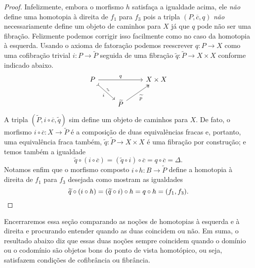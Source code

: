 \begin{proof}
  Infelizmente, embora o morfismo $h$ satisfaça a igualdade acima, ele \emph{não} define uma homotopia à direita de $f_{1}$ para $f_{3}$ pois a tripla $(P,\overline{c},q)$ \emph{não} necessariamente define um objeto de caminhos para $X$ já que $q$ pode não ser uma fibração.
  Felizmente podemos corrigir isso facilmente como no caso da homotopia à esquerda.
  Usando o axioma de fatoração podemos reescrever $q: P \to X$ como uma cofibração trivial $i: P \to \widetilde{P}$ seguida de uma fibração $\widetilde{q}: \widetilde{P} \to X \times X$ conforme indicado abaixo.
  \begin{displaymath}
    \begin{tikzcd}
      P
      \arrow[rr, "q"]
      \arrow[rd, tail, "i" {swap}, "\sim" {sloped}]
      & & X \times X
      \\ & \widetilde{P}
      \arrow[ru, two heads, "\widetilde{p}" swap]
    \end{tikzcd}
  \end{displaymath}
  A tripla $(\widetilde{P},i \circ \overline{c},\widetilde{q})$ sim define um objeto de caminhos para $X$.
  De fato, o morfismo $i \circ \overline{c}: X \to \widetilde{P}$ é a composição de duas equivalências fracas e, portanto, uma equivalência fraca também, $\widetilde{q}: \widetilde{P} \to X \times X$ é uma fibração por construção; e temos também a igualdade
  \begin{displaymath}
    \widetilde{q} \circ (i \circ \overline{c}) = (\widetilde{q} \circ i) \circ \overline{c} = q \circ \overline{c} = \Delta.
  \end{displaymath}
  Notamos enfim que o morfismo composto $i \circ h: B \to \widetilde{P}$ define a homotopia à direita de $f_{1}$ para $f_{3}$ desejada como mostram as igualdades
  \begin{displaymath}
    \widetilde{q} \circ (i \circ h) = (\widetilde{q} \circ i) \circ h = q \circ h = (f_{1},f_{3}). \qedhere
  \end{displaymath}
\end{proof}

Encerraremos essa seção comparando as noções de homotopias à esquerda e à direita e procurando entender quando as duas coincidem ou não.
Em suma, o resultado abaixo diz que essas duas noções sempre coincidem quando o domínio ou o codomínio são objetos bons do ponto de vista homotópico, ou seja, satisfazem condições de cofibrância ou fibrância.


